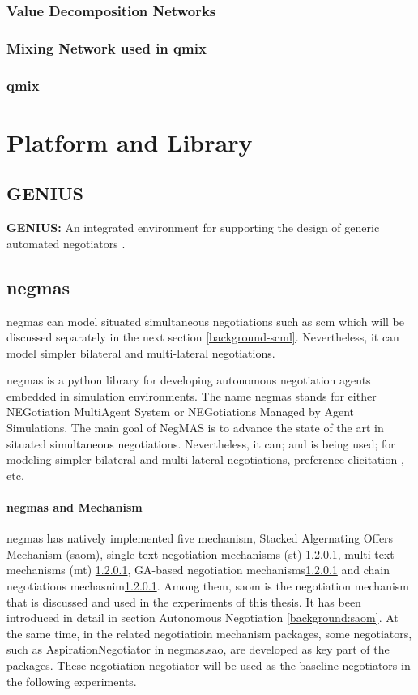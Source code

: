 \subsubsection{Value Decomposition Networks}

\subsubsection{Mixing Network used in \gls{qmix}}

\subsubsection{\gls{qmix}}

\section{Platform and Library}
\subsection{GENIUS}
\textbf{GENIUS:} An integrated environment for supporting the design of generic automated negotiators \parencite{Lin2014}.

\subsection{\gls{negmas}} \label{background:negmas}
\gls{negmas} can model situated simultaneous negotiations such as \gls{scm} which will be discussed separately in the next section \ref{background-scml}. Nevertheless, it can model simpler bilateral and multi-lateral negotiations.

\gls{negmas} is a python library for developing autonomous negotiation agents embedded in simulation environments. The name negmas stands for either NEGotiation MultiAgent System or NEGotiations Managed by Agent Simulations. The main goal of NegMAS is to advance the state of the art in situated simultaneous negotiations. Nevertheless, it can; and is being used; for modeling simpler bilateral and multi-lateral negotiations, preference elicitation , etc.

\paragraph{\gls{negmas} and Mechanism}
\gls{negmas} has natively implemented five mechanism, Stacked Algernating Offers Mechanism (\gls{saom}), single-text negotiation mechanisms (st) \ref{}, multi-text mechanisms (mt) \ref{}, GA-based negotiation mechanisms\ref{} and chain negotiations mechasnim\ref{}. Among them, \gls{saom} is the negotiation mechanism that is discussed and used in the experiments of this thesis. It has been introduced in detail in section Autonomous Negotiation \ref{background:saom}. At the same time, in the related negotiatioin mechanism packages, some negotiators, such as AspirationNegotiator in negmas.sao, are developed as key part of the packages. These negotiation negotiator will be used as the baseline negotiators in the following experiments.
